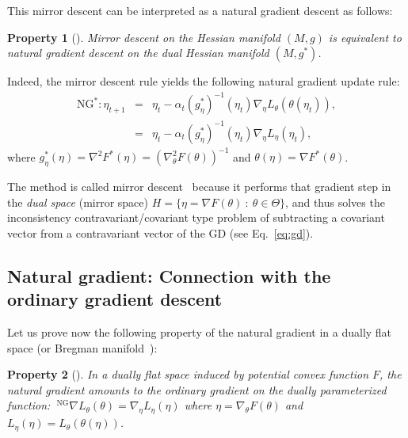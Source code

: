 \documentclass[11pt]{article}
\def\leftsup#1{\ ^{#1}}
\def\NG{\mathrm{NG}}
\def\nablaNG{\leftsup{\NG}\nabla}
\newtheorem{property}{Property}
\begin{document}
This mirror descent can be interpreted as a natural gradient descent as follows:

\begin{property}[\cite{MDIG-2015}]
Mirror descent on the Hessian manifold $(M,g)$ is equivalent to natural gradient descent on the dual Hessian manifold $(M,g^*)$.
\end{property}

Indeed, the mirror descent rule yields the following natural gradient update rule:
\begin{eqnarray}
\mathrm{NG}^*:\eta_{t+1} &=&\eta_t-\alpha_t (g^*_\eta)^{-1}(\eta_t)\nabla_{\eta} L_\theta(\theta(\eta_t)),\\
&=& \eta_t-\alpha_t (g^*_\eta)^{-1}(\eta_t)\nabla_{\eta} L_\eta(\eta_t),
\end{eqnarray}
where $g^*_\eta(\eta)=\nabla^2 F^*(\eta)=(\nabla^2_\theta F(\theta))^{-1}$ and $\theta(\eta)=\nabla F^*(\theta)$.

The method is called mirror descent~\cite{Bubeck-2015} because it performs that gradient step in the {\em dual space} (mirror space) $H=\{\eta=\nabla F(\theta)\ : \ \theta\in\Theta\}$, and thus solves the inconsistency contravariant/covariant type problem of subtracting a covariant vector from a contravariant vector of the GD (see Eq.~\ref{eq:gd}).



\subsection{Natural gradient: Connection with the ordinary gradient descent}

Let us prove now the following property of the natural gradient in a dually flat space (or Bregman manifold~\cite{DFS-2019}):

\begin{property}[\cite{Zhang-2018}]
In a dually flat space induced by potential convex function $F$, the natural gradient amounts to the ordinary gradient on the dually parameterized function: $\nablaNG L_\theta(\theta)=\nabla_\eta L_\eta(\eta)$ where $\eta=\nabla_\theta F(\theta)$ and $L_\eta(\eta)=L_\theta(\theta(\eta))$. 
\end{property}
\end{document}
